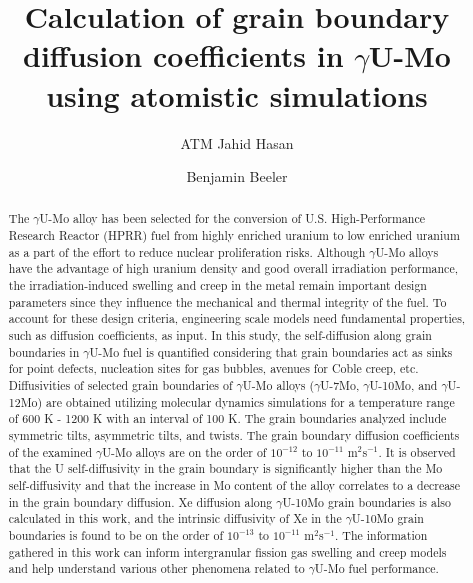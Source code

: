 \documentclass{elsarticle}
\begin{document}
\begin{frontmatter}

\title{Calculation of grain boundary diffusion coefficients in $\gamma$U-Mo using atomistic simulations}

\author[ncsu]{ATM Jahid Hasan}
\author[ncsu,inl]{Benjamin Beeler}

\address[ncsu]{Department of Nuclear Engineering, North Carolina State University, Raleigh, NC 27695, United States}
\address[inl]{Idaho National Laboratory, Idaho Falls, ID 83415, United States}

\begin{abstract}
	The $\gamma$U-Mo alloy has been selected for the conversion of U.S. High-Performance Research Reactor (HPRR) fuel from highly enriched uranium to low enriched uranium as a part of the effort to reduce nuclear proliferation risks. Although $\gamma$U-Mo alloys have the advantage of high uranium density and good overall irradiation performance, the irradiation-induced swelling and creep in the metal remain important design parameters since they influence the mechanical and thermal integrity of the fuel. To account for these design criteria, engineering scale models need fundamental properties, such as diffusion coefficients, as input. In this study, the self-diffusion along grain boundaries in $\gamma$U-Mo fuel is quantified considering that grain boundaries act as sinks for point defects, nucleation sites for gas bubbles, avenues for Coble creep, etc. Diffusivities of selected grain boundaries of $\gamma$U-Mo alloys ($\gamma$U-7Mo, $\gamma$U-10Mo, and $\gamma$U-12Mo) are obtained utilizing molecular dynamics simulations for a temperature range of 600 K - 1200 K with an interval of 100 K. The grain boundaries analyzed include symmetric tilts, asymmetric tilts, and twists. The grain boundary diffusion coefficients of the examined $\gamma$U-Mo alloys are on the order of $10^{-12}$ to $10^{-11}$ m$^2$s$^{-1}$. It is observed that the U self-diffusivity in the grain boundary is significantly higher than the Mo self-diffusivity and that the increase in Mo content of the alloy correlates to a decrease in the grain boundary diffusion. Xe diffusion along $\gamma$U-10Mo grain boundaries is also calculated in this work, and the intrinsic diffusivity of Xe in the $\gamma$U-10Mo grain boundaries is found to be on the order of $10^{-13}$ to $10^{-11}$ m$^2$s$^{-1}$. The information gathered in this work can inform intergranular fission gas swelling and creep models and help understand various other phenomena related to $\gamma$U-Mo fuel performance.
\end{abstract}

\end{frontmatter}
\end{document}
